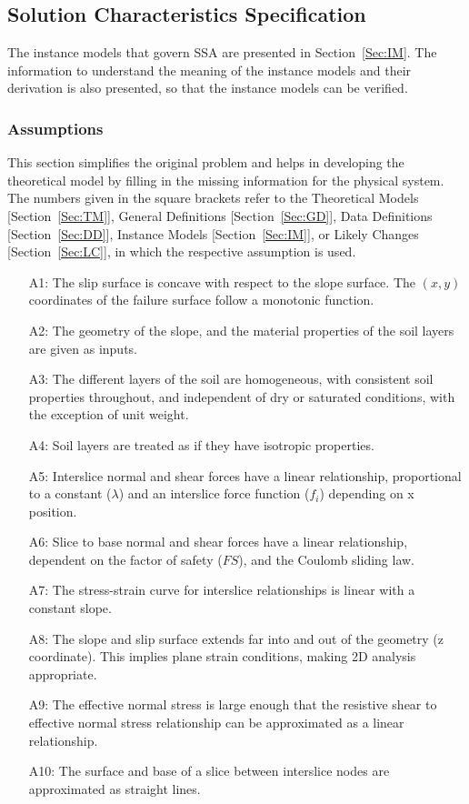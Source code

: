 \documentclass[12pt]{article}
\begin{document}
\subsection{Solution Characteristics Specification}
\label{Sec:SCS}
The instance models that govern SSA are presented in Section~\ref{Sec:IM}. The information to understand the meaning of the instance models and their derivation is also presented, so that the instance models can be verified.
\subsubsection{Assumptions}
\label{Sec:A}
This section simplifies the original problem and helps in developing the theoretical model by filling in the missing information for the physical system. The numbers given in the square brackets refer to the Theoretical Models [Section~\ref{Sec:TM}], General Definitions [Section~\ref{Sec:GD}], Data Definitions [Section~\ref{Sec:DD}], Instance Models [Section~\ref{Sec:IM}], or Likely Changes [Section~\ref{Sec:LC}], in which the respective assumption is used.
\begin{itemize}
\item[A1:]The slip surface is concave with respect to the slope surface. The $(x,y)$ coordinates of the failure surface follow a monotonic function.
\item[A2:]The geometry of the slope, and the material properties of the soil layers are given as inputs.
\item[A3:]The different layers of the soil are homogeneous, with consistent soil properties throughout, and independent of dry or saturated conditions, with the exception of unit weight.
\item[A4:]Soil layers are treated as if they have isotropic properties.
\item[A5:]Interslice normal and shear forces have a linear relationship, proportional to a constant ($\lambda{}$) and an interslice force function ($f_{i}$) depending on x position.
\item[A6:]Slice to base normal and shear forces have a linear relationship, dependent on the factor of safety ($FS$), and the Coulomb sliding law.
\item[A7:]The stress-strain curve for interslice relationships is linear with a constant slope.
\item[A8:]The slope and slip surface extends far into and out of the geometry (z coordinate). This implies plane strain conditions, making 2D analysis appropriate.
\item[A9:]The effective normal stress is large enough that the resistive shear to effective normal stress relationship can be approximated as a linear relationship.
\item[A10:]The surface and base of a slice between interslice nodes are approximated as straight lines.
\end{itemize}
\end{document}
